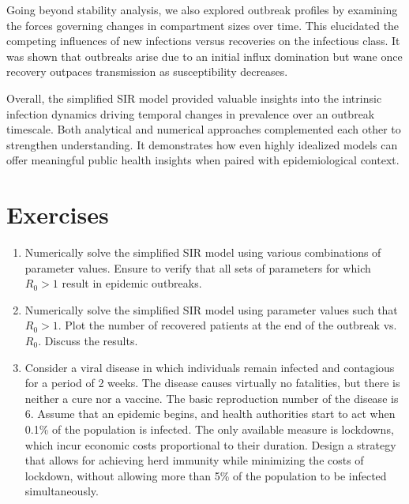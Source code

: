 Going beyond stability analysis, we also explored outbreak profiles by examining the forces governing changes in compartment sizes over time. This elucidated the competing influences of new infections versus recoveries on the infectious class. It was shown that outbreaks arise due to an initial influx domination but wane once recovery outpaces transmission as susceptibility decreases.

Overall, the simplified SIR model provided valuable insights into the intrinsic infection dynamics driving temporal changes in prevalence over an outbreak timescale. Both analytical and numerical approaches complemented each other to strengthen understanding. It demonstrates how even highly idealized models can offer meaningful public health insights when paired with epidemiological context.

\section{Exercises}

\begin{enumerate}
    \item Numerically solve the simplified SIR model using various combinations of parameter values. Ensure to verify that all sets of parameters for which $R_0 > 1$ result in epidemic outbreaks.
  
    \item Numerically solve the simplified SIR model using parameter values such that $R_0 > 1$. Plot the number of recovered patients at the end of the outbreak vs. $R_0$. Discuss the results.
  
    \item Consider a viral disease in which individuals remain infected and contagious for a period of 2 weeks. The disease causes virtually no fatalities, but there is neither a cure nor a vaccine. The basic reproduction number of the disease is 6. Assume that an epidemic begins, and health authorities start to act when 0.1\% of the population is infected. The only available measure is lockdowns, which incur economic costs proportional to their duration. Design a strategy that allows for achieving herd immunity while minimizing the costs of lockdown, without allowing more than 5\% of the population to be infected simultaneously.
  
\end{enumerate}
  
